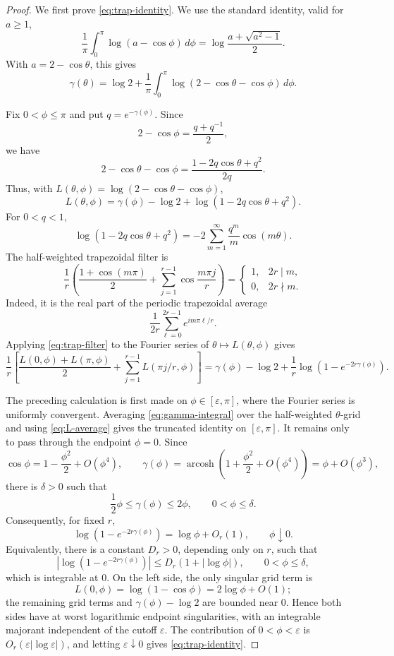 \documentclass[10pt,a4paper]{amsart}
\DeclareMathOperator{\arcosh}{arcosh}
\newcommand{\dd}{\,d}
\begin{document}
\begin{proof}
We first prove \eqref{eq:trap-identity}. We use the standard identity, valid for $a\ge1$,
\[
  \frac1\pi\int_0^\pi\log(a-\cos\phi)\dd\phi
  =
  \log\frac{a+\sqrt{a^2-1}}{2}.
\]
With $a=2-\cos\theta$, this gives
\begin{equation}\label{eq:gamma-integral}
  \gamma(\theta)
  =
  \log2+
  \frac1\pi\int_0^\pi
  \log(2-\cos\theta-\cos\phi)\dd\phi.
\end{equation}

Fix $0<\phi\le\pi$ and put $q=e^{-\gamma(\phi)}$. Since
\[
  2-\cos\phi=\frac{q+q^{-1}}2,
\]
we have
\[
  2-\cos\theta-\cos\phi
  =
  \frac{1-2q\cos\theta+q^2}{2q}.
\]
Thus, with $L(\theta,\phi)=\log(2-\cos\theta-\cos\phi)$,
\[
  L(\theta,\phi)
  =
  \gamma(\phi)-\log2+
  \log(1-2q\cos\theta+q^2).
\]
For $0<q<1$,
\[
  \log(1-2q\cos\theta+q^2)
  =
  -2\sum_{m=1}^\infty\frac{q^m}{m}\cos(m\theta).
\]
The half-weighted trapezoidal filter is
\begin{equation}\label{eq:trap-filter}
  \frac1r\left(
  \frac{1+\cos(m\pi)}2+
  \sum_{j=1}^{r-1}\cos\frac{m\pi j}{r}
  \right)
  =
  \begin{cases}
  1,&2r\mid m,\\
  0,&2r\nmid m.
  \end{cases}
\end{equation}
Indeed, it is the real part of the periodic trapezoidal average
\[
  \frac1{2r}\sum_{\ell=0}^{2r-1}e^{i m\pi\ell/r}.
\]
Applying \eqref{eq:trap-filter} to the Fourier series of $\theta\mapsto L(\theta,\phi)$ gives
\begin{equation}\label{eq:L-average}
  \frac1r\left[
  \frac{L(0,\phi)+L(\pi,\phi)}2+
  \sum_{j=1}^{r-1}L(\pi j/r,\phi)
  \right]
  =
  \gamma(\phi)-\log2+
  \frac1r\log\left(1-e^{-2r\gamma(\phi)}\right).
\end{equation}

The preceding calculation is first made on $\phi\in[\varepsilon,\pi]$, where the Fourier series is uniformly convergent. Averaging \eqref{eq:gamma-integral} over the half-weighted $\theta$-grid and using \eqref{eq:L-average} gives the truncated identity on $[\varepsilon,\pi]$. It remains only to pass through the endpoint $\phi=0$. Since
\[
  \cos\phi=1-\frac{\phi^2}{2}+O(\phi^4),
  \qquad
  \gamma(\phi)=\arcosh\left(1+\frac{\phi^2}{2}+O(\phi^4)\right)
  =\phi+O(\phi^3),
\]
there is $\delta>0$ such that
\[
  \frac12\phi\le \gamma(\phi)\le 2\phi,
  \qquad 0<\phi\le\delta.
\]
Consequently, for fixed $r$,
\[
  \log\left(1-e^{-2r\gamma(\phi)}\right)
  =
  \log\phi+O_r(1),
  \qquad \phi\downarrow0.
\]
Equivalently, there is a constant $D_r>0$, depending only on $r$, such that
\[
  \left|\log\left(1-e^{-2r\gamma(\phi)}\right)\right|
  \le D_r(1+|\log\phi|),
  \qquad 0<\phi\le\delta,
\]
which is integrable at $0$.
On the left side, the only singular grid term is
\[
  L(0,\phi)=\log(1-\cos\phi)=2\log\phi+O(1);
\]
the remaining grid terms and $\gamma(\phi)-\log2$ are bounded near $0$. Hence both sides have at worst logarithmic endpoint singularities, with an integrable majorant independent of the cutoff $\varepsilon$. The contribution of $0<\phi<\varepsilon$ is $O_r(\varepsilon|\log\varepsilon|)$, and letting $\varepsilon\downarrow0$ gives \eqref{eq:trap-identity}.


\end{proof}
\end{document}
